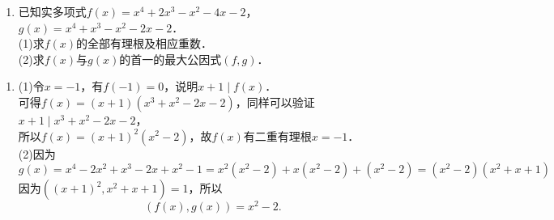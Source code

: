 \documentclass{article}
\begin{document}
\vspace{1ex}
\begin{enumerate}
    \item 已知实多项式$f(x)=x^4+2x^3-x^2-4x-2$，$g(x)=x^4+x^3-x^2-2x-2$． \\
          (1)求$f(x)$的全部有理根及相应重数． \\
          (2)求$f(x)$与$g(x)$的首一的最大公因式$(f,g)$．
\end{enumerate}
\begin{enumerate}[\qquad 解：]
    \item
          (1)令$x=-1$，有$f(-1)=0$，说明$x+1\mid f(x)$．\\
          可得$f(x)=(x+1)(x^3+x^2-2x-2)$，同样可以验证$x+1\mid x^3+x^2-2x-2$，\\
          所以$f(x)=(x+1)^2(x^2-2)$，故$f(x)$有二重有理根$x=-1$．\\
          (2)因为$$g(x)=x^4-2x^2+x^3-2x+x^2-1=x^2(x^2-2)+x(x^2-2)+(x^2-2)=(x^2-2)(x^2+x+1)$$
          因为$((x+1)^2,x^2+x+1)=1$，所以 \\
          $$(f(x),g(x))=x^2-2.$$
\end{enumerate}
\end{document}
